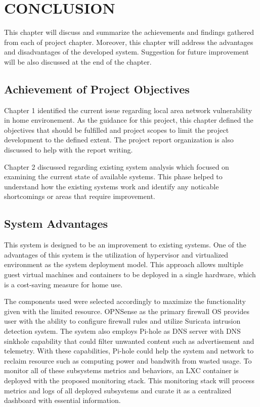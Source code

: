 \documentclass[../index.tex]{subfiles}
\begin{document}
\chapter{CONCLUSION}

This chapter will discuss and summarize the achievements and findings gathered from each of project
chapter. Moreover, this chapter will address the advantages and disadvantages of the developed
system. Suggestion for future improvement will be also discussed at the end of the chapter.

\section{Achievement of Project Objectives}

Chapter 1 identified the current issue regarding local area network vulnerability in home
environement. As the guidance for this project, this chapter defined the objectives that should be
fulfilled and project scopes to limit the project development to the defined extent. The project
report organization is also discussed to help with the report writing.

Chapter 2 discussed regarding existing system analysis which focused on examining the current state of
available systems. This phase helped to understand how the existing systems work and identify any
noticable shortcomings or areas that require improvement.

\section{System Advantages}

This system is designed to be an improvement to existing systems. One of the advantages of this
system is the utilization of hypervisor and virtualized environment as the system deployment model.
This approach allows multiple guest virtual machines and containers to be deployed in a single
hardware, which is a cost-saving measure for home use.

The components used were selected accordingly to maximize the functionality given with the limited
resource. OPNSense as the primary firewall OS provides user with the ability to configure firewall
rules and utilize Suricata intrusion detection system. The system also employs Pi-hole as DNS server
with DNS sinkhole capability that could filter unwanted content such as advertisement and telemetry.
With these capabilities, Pi-hole could help the system and network to reclaim resource such as
computing power and bandwith from wasted usage. To monitor all of these subsystems metrics and
behaviors, an LXC container is deployed with the proposed monitoring stack. This monitoring stack
will process metrics and logs of all deployed subsystems and curate it as a centralized dashboard
with essential information.
\end{document}
